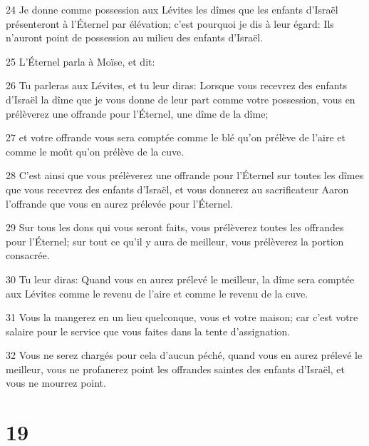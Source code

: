 \par 24 Je donne comme possession aux Lévites les dîmes que les enfants d'Israël présenteront à l'Éternel par élévation; c'est pourquoi je dis à leur égard: Ils n'auront point de possession au milieu des enfants d'Israël.
\par 25 L'Éternel parla à Moïse, et dit:
\par 26 Tu parleras aux Lévites, et tu leur diras: Lorsque vous recevrez des enfants d'Israël la dîme que je vous donne de leur part comme votre possession, vous en prélèverez une offrande pour l'Éternel, une dîme de la dîme;
\par 27 et votre offrande vous sera comptée comme le blé qu'on prélève de l'aire et comme le moût qu'on prélève de la cuve.
\par 28 C'est ainsi que vous prélèverez une offrande pour l'Éternel sur toutes les dîmes que vous recevrez des enfants d'Israël, et vous donnerez au sacrificateur Aaron l'offrande que vous en aurez prélevée pour l'Éternel.
\par 29 Sur tous les dons qui vous seront faits, vous prélèverez toutes les offrandes pour l'Éternel; sur tout ce qu'il y aura de meilleur, vous prélèverez la portion consacrée.
\par 30 Tu leur diras: Quand vous en aurez prélevé le meilleur, la dîme sera comptée aux Lévites comme le revenu de l'aire et comme le revenu de la cuve.
\par 31 Vous la mangerez en un lieu quelconque, vous et votre maison; car c'est votre salaire pour le service que vous faites dans la tente d'assignation.
\par 32 Vous ne serez chargés pour cela d'aucun péché, quand vous en aurez prélevé le meilleur, vous ne profanerez point les offrandes saintes des enfants d'Israël, et vous ne mourrez point.

\chapter{19}

